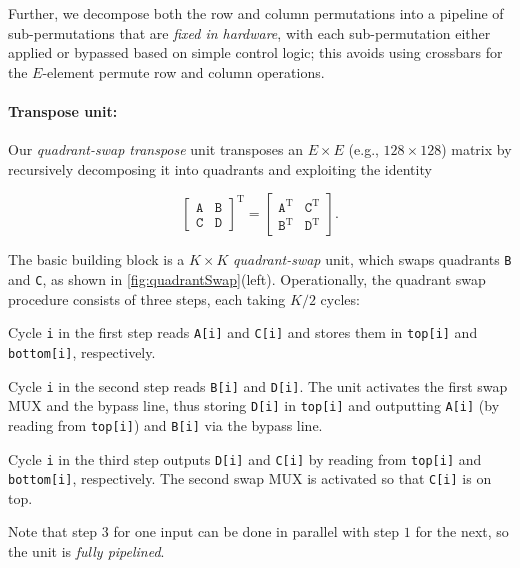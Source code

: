 \figautfu


Further, we decompose both the row and column permutations into a pipeline of sub-permutations that are \textit{fixed in hardware},
with each sub-permutation either applied or bypassed based on simple control logic; this avoids using crossbars for the $E$-element permute row and column operations.

\figQuadrantSwap

\paragraph{Transpose unit:}
Our \textit{quadrant-swap transpose} unit transposes an $E \times E$ (e.g., $128\times 128$) matrix by recursively decomposing it into quadrants and exploiting
the identity

\vspace{-12pt}
\begin{equation*}
  \left[ \begin{array}{c|c}
      \texttt{A} & \texttt{B}\\
      \hline
      \texttt{C} & \texttt{D}
  \end{array}\right]^{\textrm{T}} =   \left[ \begin{array}{c|c}
      \texttt{A}^{\textrm{T}} & \texttt{C}^{\textrm{T}} \\
      \hline
      \texttt{B}^{\textrm{T}} & \texttt{D}^{\textrm{T}}
  \end{array}\right].
\end{equation*}

The basic building block is a $K \times K$ \textit{quadrant-swap} unit, which swaps quadrants \texttt{B} and \texttt{C}, as shown in \autoref{fig:quadrantSwap}(left). Operationally, the quadrant swap procedure consists of three steps, each taking $K/2$ cycles:
\begin{compactenum}
  \item Cycle \texttt{i} in the first step reads \texttt{A[i]} and \texttt{C[i]} and stores them in \texttt{top[i]} and \texttt{bottom[i]}, respectively.
\item Cycle \texttt{i} in the second step reads \texttt{B[i]} and \texttt{D[i]}. The unit activates the first swap MUX and the bypass line, thus storing \texttt{D[i]} in \texttt{top[i]} and outputting \texttt{A[i]} (by reading from \texttt{top[i]}) and \texttt{B[i]} via the bypass line.
\item Cycle \texttt{i} in the third step outputs \texttt{D[i]} and \texttt{C[i]} by reading from \texttt{top[i]} and \texttt{bottom[i]}, respectively. The second swap MUX is activated so that \texttt{C[i]} is on top.
\end{compactenum}
Note that step $3$ for one input can be done in parallel with step $1$ for the next, so the unit is \emph{fully pipelined}.

